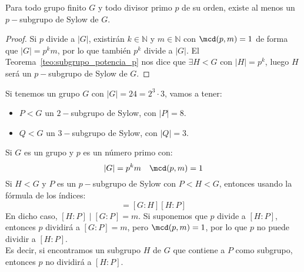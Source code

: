 \begin{coro}
    Para todo grupo finito $G$ y todo divisor primo $p$ de su orden, existe al menos un $p-$subgrupo de Sylow de $G$.
    \begin{proof}
        Si $p$ divide a $|G|$, existirán $k\in \mathbb{N}$ y $m\in \mathbb{N}$ con $\mcd(p,m)=1$ de forma que $|G| = p^k m$, por lo que también $p^k$ divide a $|G|$. El Teorema~\ref{teo:subgrupo_potencia_p} nos dice que $\exists H<G$ con $|H| = p^k$, luego $H$ será un $p-$subgrupo de Sylow de $G$.
    \end{proof}
\end{coro}

\begin{ejemplo}
    Si tenemos un grupo $G$ con $|G| = 24 = 2^3 \cdot 3$, vamos a tener:
    \begin{itemize}
        \item $P<G$ un $2-$subgrupo de Sylow, con $|P| = 8$.
        \item $Q<G$ un $3-$subgrupo de Sylow, con $|Q| = 3$.
    \end{itemize}
\end{ejemplo}

\begin{observacion}
    Si $G$ es un grupo y $p$ es un número primo con:
    \begin{equation*}
        |G| = p^k m \quad \mcd(p,m) = 1
    \end{equation*}
    Si $H< G$ y $P$ es un $p-$subgrupo de Sylow con $P<H<G$, entonces usando la fórmula de los índices:
    \begin{equation*}
        [G:P] = [G:H][H:P]
    \end{equation*}
    En dicho caso, $[H:P] \mid [G:P] = m$. Si suponemos que $p$ divide a $[H:P]$, entonces $p$ dividirá a $[G:P] = m$, pero $\mcd(p,m) = 1$, por lo que $p$ no puede dividir a $[H:P]$.\\

    \noindent
    Es decir, si encontramos un subgrupo $H$ de $G$ que contiene a $P$ como subgrupo, entonces $p$ no dividirá a $[H:P]$.
\end{observacion}~\\


